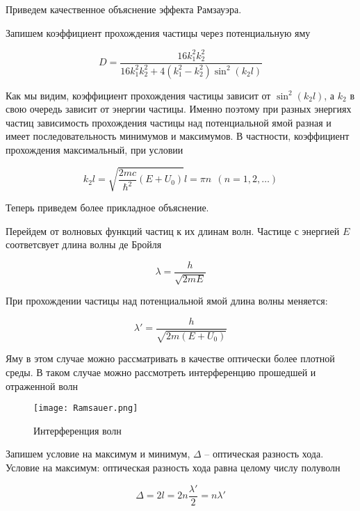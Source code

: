     Приведем качественное объяснение эффекта Рамзауэра.

    Запишем коэффициент прохождения частицы через потенциальную яму

    \begin{equation}
        D = \frac{16 k_1^2 k_2^2}{16 k_1^2 k_2^2 + 4(k_1^2 - k_2^2) \sin^2 (k_2 l)}
    \end{equation}

    Как мы видим, коэффициент прохождения частицы зависит от $\sin^2 (k_2 l)$, а $k_2$ в свою очередь зависит от энергии
    частицы. Именно поэтому при разных энергиях частиц зависимость прохождения частицы над потенциальной ямой разная и имеет
    последовательность минимумов и максимумов. В частности, коэффициент прохождения максимальный, при условии

    \begin{equation}
        k_2 l = \sqrt{\frac{2mc}{\hbar^2}(E + U_0)} l = \pi n ~~ (n = 1, 2, \dots)
    \end{equation}

    Теперь приведем более прикладное объяснение.

    Перейдем от волновых функций частиц к их длинам волн. Частице с энергией $E$ соответсвует длина волны де Бройля

    \begin{equation}
        \lambda = \frac{h}{\sqrt{2mE}}
    \end{equation}

    При прохождении частицы над потенциальной ямой длина волны меняется:

    \begin{equation}
        \lambda' = \frac{h}{\sqrt{2m(E+U_0)}}
    \end{equation}

    Яму в этом случае можно рассматривать в качестве оптически более плотной среды. В таком случае можно рассмотреть
    интерференцию прошедшей и отраженной волн

    \begin{figure}
        \centering
        \texttt{[image: Ramsauer.png]}
        \caption{Интерференция волн}
        \label{fig:interf}
    \end{figure}

    Запишем условие на максимум и минимум, $\Delta$ -- оптическая разность хода. Условие на максимум: оптическая разность хода
    равна целому числу полуволн

    \begin{equation}
        \Delta = 2l = 2n \frac{\lambda'}{2} = n \lambda'
    \end{equation}

